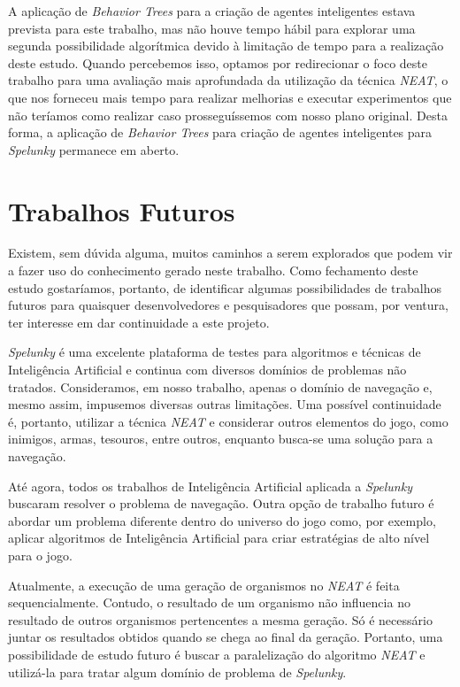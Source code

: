 A aplicação de \textit{Behavior Trees} para a criação de agentes inteligentes
estava prevista para este trabalho, mas não houve tempo hábil para explorar uma
segunda possibilidade algorítmica devido à limitação de tempo para a realização
deste estudo. Quando percebemos isso, optamos por redirecionar o foco deste
trabalho para uma avaliação mais aprofundada da utilização da técnica
\textit{NEAT}, o que nos forneceu mais tempo para realizar melhorias e executar
experimentos que não teríamos como realizar caso prosseguíssemos com nosso plano
original. Desta forma, a aplicação de \textit{Behavior Trees} para criação de
agentes inteligentes para \textit{Spelunky} permanece em aberto.


\section{Trabalhos Futuros}
Existem, sem dúvida alguma, muitos caminhos a serem explorados que podem vir a
fazer uso do conhecimento gerado neste trabalho. Como fechamento deste estudo
gostaríamos, portanto, de identificar algumas possibilidades de trabalhos
futuros para quaisquer desenvolvedores e pesquisadores que possam, por ventura,
ter interesse em dar continuidade a este projeto.

\textit{Spelunky} é uma excelente plataforma de testes para algoritmos e
técnicas de Inteligência Artificial e continua com diversos domínios de
problemas não tratados. Consideramos, em nosso trabalho, apenas o domínio de
navegação e, mesmo assim, impusemos diversas outras limitações. Uma possível
continuidade é, portanto, utilizar a técnica \textit{NEAT} e considerar outros
elementos do jogo, como inimigos, armas, tesouros, entre outros, enquanto
busca-se uma solução para a navegação.

Até agora, todos os trabalhos de Inteligência Artificial aplicada a
\textit{Spelunky} buscaram resolver o problema de navegação. Outra opção de
trabalho futuro é abordar um problema diferente dentro do universo do jogo como,
por exemplo, aplicar algoritmos de Inteligência Artificial para criar
estratégias de alto nível para o jogo.

Atualmente, a execução de uma geração de organismos no \textit{NEAT} é feita
sequencialmente.  Contudo, o resultado de um organismo não influencia no
resultado de outros organismos pertencentes a mesma geração. Só é necessário
juntar os resultados obtidos quando se chega ao final da geração. Portanto, uma
possibilidade de estudo futuro é buscar a paralelização do algoritmo
\textit{NEAT} e utilizá-la para tratar algum domínio de problema de
\textit{Spelunky}.

